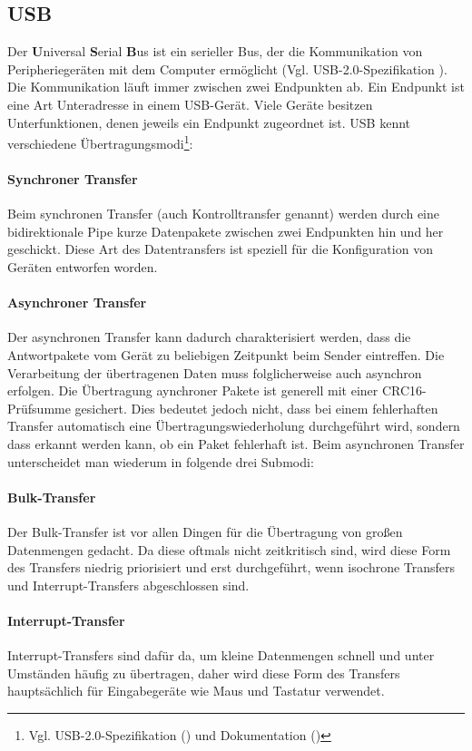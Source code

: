 \subsection{USB}
Der \textbf{U}niversal \textbf{S}erial \textbf{B}us ist ein serieller Bus, der die Kommunikation von Peripheriegeräten mit dem Computer ermöglicht (Vgl. USB-2.0-Spezifikation \autocite{standard:usb2}).
Die Kommunikation läuft immer zwischen zwei Endpunkten ab.
Ein Endpunkt ist eine Art Unteradresse in einem USB-Gerät.
Viele Geräte besitzen Unterfunktionen, denen jeweils ein Endpunkt zugeordnet ist.
USB kennt verschiedene Übertragungsmodi\footnote{Vgl. USB-2.0-Spezifikation (\autocite{standard:usb2}) und \libusb{} Dokumentation (\autocite{website:libusbx})}:

\paragraph{Synchroner Transfer}
Beim synchronen Transfer (auch Kontrolltransfer genannt) werden durch eine bidirektionale Pipe kurze Datenpakete zwischen zwei Endpunkten hin und her geschickt.
Diese Art des Datentransfers ist speziell für die Konfiguration von Geräten entworfen worden.

\paragraph{Asynchroner Transfer}
Der asynchronen Transfer kann dadurch charakterisiert werden, dass die Antwortpakete vom Gerät zu beliebigen Zeitpunkt beim Sender eintreffen.
Die Verarbeitung der übertragenen Daten muss folglicherweise auch asynchron erfolgen.
Die Übertragung aynchroner Pakete ist generell mit einer CRC16-Prüfsumme gesichert.
Dies bedeutet jedoch nicht, dass bei einem fehlerhaften Transfer automatisch eine Übertragungswiederholung durchgeführt wird, sondern dass erkannt werden kann, ob ein Paket fehlerhaft ist.
Beim asynchronen Transfer unterscheidet man wiederum in folgende drei Submodi:

\paragraph{Bulk-Transfer}
Der Bulk-Transfer ist vor allen Dingen für die Übertragung von großen Datenmengen gedacht.
Da diese oftmals nicht zeitkritisch sind, wird diese Form des Transfers niedrig priorisiert und erst durchgeführt, wenn isochrone Transfers und Interrupt-Transfers abgeschlossen sind.

\paragraph{Interrupt-Transfer}
Interrupt-Transfers sind dafür da, um kleine Datenmengen schnell und unter Umständen häufig zu übertragen, daher wird diese Form des Transfers hauptsächlich für Eingabegeräte wie Maus und Tastatur verwendet.


